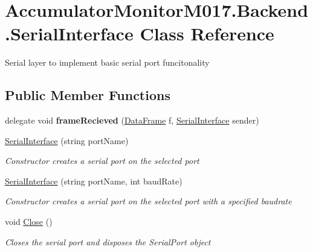 \hypertarget{class_accumulator_monitor_m017_1_1_backend_1_1_serial_interface}{}\section{Accumulator\+Monitor\+M017.\+Backend.\+Serial\+Interface Class Reference}
\label{class_accumulator_monitor_m017_1_1_backend_1_1_serial_interface}


Serial layer to implement basic serial port funcitonality  


\subsection*{Public Member Functions}
\begin{DoxyCompactItemize}
\item 
\mbox{\label{class_accumulator_monitor_m017_1_1_backend_1_1_serial_interface_a75829fb33c85165568cc2474c9332676}} 
delegate void {\bfseries frame\+Recieved} (\hyperlink{class_accumulator_monitor_m017_1_1_backend_1_1_data_frame}{Data\+Frame} f, \hyperlink{class_accumulator_monitor_m017_1_1_backend_1_1_serial_interface}{Serial\+Interface} sender)
\item 
\hyperlink{class_accumulator_monitor_m017_1_1_backend_1_1_serial_interface_a06cd4b9b4f2e6f592c215690a4926078}{Serial\+Interface} (string port\+Name)
\begin{DoxyCompactList}\small\item\em Constructor creates a serial port on the selected port \end{DoxyCompactList}\item 
\hyperlink{class_accumulator_monitor_m017_1_1_backend_1_1_serial_interface_a7a39fd8741e9c86ace8cf1476a889fdc}{Serial\+Interface} (string port\+Name, int baud\+Rate)
\begin{DoxyCompactList}\small\item\em Constructor creates a serial port on the selected port with a specified baudrate \end{DoxyCompactList}\item 
void \hyperlink{class_accumulator_monitor_m017_1_1_backend_1_1_serial_interface_a87f42f4a08951d6dbbdc7f4b6532d3d4}{Close} ()
\begin{DoxyCompactList}\small\item\em Closes the serial port and disposes the Serial\+Port object \end{DoxyCompactList}\end{DoxyCompactItemize}
